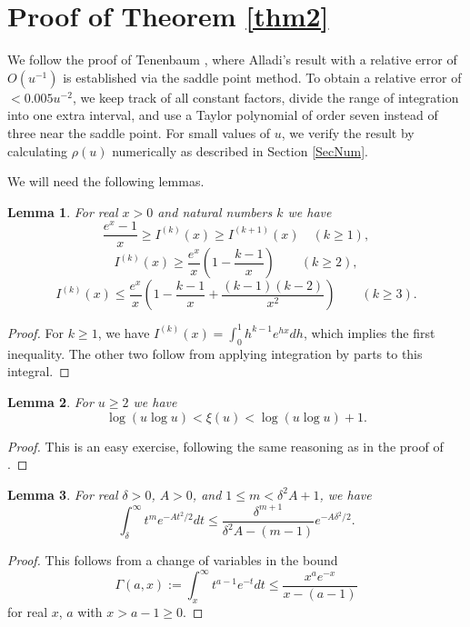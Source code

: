 \documentclass[11pt]{amsart}
\newtheorem{lemma}{Lemma}
\begin{document}
\section{Proof of Theorem \ref{thm2}}

We follow the proof of Tenenbaum \cite[Thm.~III.5.13]{Ten}, 
where Alladi's result \cite[(3.9)]{All} with a relative error of $O(u^{-1})$ is established
via the saddle point method. To obtain a relative error of $<0.005 u^{-2}$, 
we keep track of all constant factors, divide the range of integration into one extra interval,
 and use a Taylor polynomial of order seven instead of three near the saddle point. 
For small values of $u$, we verify the result by calculating $\rho(u)$ numerically as described in Section \ref{SecNum}.

We will need the following lemmas.

\begin{lemma}\label{lemIk}
For real $x>0$ and natural numbers $k$ we have 
$$
\frac{e^x -1}{x} \ge I^{(k)}(x) \ge I^{(k+1)}(x) \quad (k\ge 1),
$$
$$
I^{(k)}(x) \ge \frac{e^x}{x} \left(1-\frac{k-1}{x}\right) \qquad (k\ge 2),
$$
$$
I^{(k)}(x) \le  \frac{e^x}{x} \left(1-\frac{k-1}{x}+\frac{(k-1)(k-2)}{x^2}\right) \qquad (k\ge 3).
$$
\end{lemma}
\begin{proof}
For $k\ge 1$, we have $I^{(k)}(x) = \int_0^1 h^{k-1} e^{hx} dh$, which implies the first inequality.
The other two follow from applying integration by parts to this integral.
\end{proof}

\begin{lemma}\label{lemxi}
For $u\ge 2$ we have 
$$
\log (u\log u) < \xi(u) < \log (u\log u) +1.
$$
\end{lemma}
\begin{proof}
This is an easy exercise, following the same reasoning as in the proof of \cite[Lem.~III.5.11]{Ten}.
\end{proof}


\begin{lemma}\label{lemtail}
For real $\delta >0$, $A>0$, and $1\le m < \delta^2 A+1$, we have
$$
\int_\delta^\infty t^m e^{-A t^2/2} dt \le \frac{\delta^{m+1}}{\delta^2 A - (m-1)} e^{-A\delta^2/2}.
$$
\end{lemma}
\begin{proof}
This follows from a change of variables in the bound \cite[Prop.~2.7]{Pin} 
$$
\Gamma(a,x):=\int_x^\infty t^{a-1} e^{-t} dt \le \frac{x^a e^{-x}}{x-(a-1)}
$$
for real $x$, $a$ with $x>a-1\ge 0$.
\end{proof}
\end{document}
